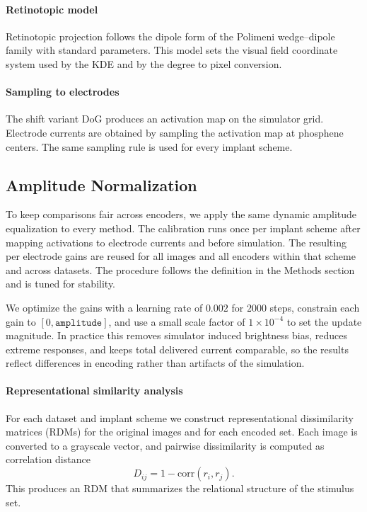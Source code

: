 \paragraph{Retinotopic model}
Retinotopic projection follows the dipole form of the Polimeni wedge–dipole family with standard parameters. This model sets the visual field coordinate system used by the KDE and by the degree to pixel conversion.

\paragraph{Sampling to electrodes}
The shift variant DoG produces an activation map on the simulator grid. Electrode currents are obtained by sampling the activation map at phosphene centers. The same sampling rule is used for every implant scheme.

\subsection{Amplitude Normalization}
To keep comparisons fair across encoders, we apply the same dynamic amplitude equalization to every method. The calibration runs once per implant scheme after mapping activations to electrode currents and before simulation. The resulting per electrode gains are reused for all images and all encoders within that scheme and across datasets. The procedure follows the definition in the Methods section and is tuned for stability.

We optimize the gains with a learning rate of \(0.002\) for \(2000\) steps, constrain each gain to \([0,\texttt{amplitude}]\), and use a small scale factor of \(1\times10^{-4}\) to set the update magnitude. In practice this removes simulator induced brightness bias, reduces extreme responses, and keeps total delivered current comparable, so the results reflect differences in encoding rather than artifacts of the simulation.

\paragraph{Representational similarity analysis}
For each dataset and implant scheme we construct representational dissimilarity matrices (RDMs) for the original images and for each encoded set. 
Each image is converted to a grayscale vector, and pairwise dissimilarity is computed as correlation distance
\[
D_{ij} = 1 - \mathrm{corr}(r_i, r_j).
\]
This produces an RDM that summarizes the relational structure of the stimulus set. 

